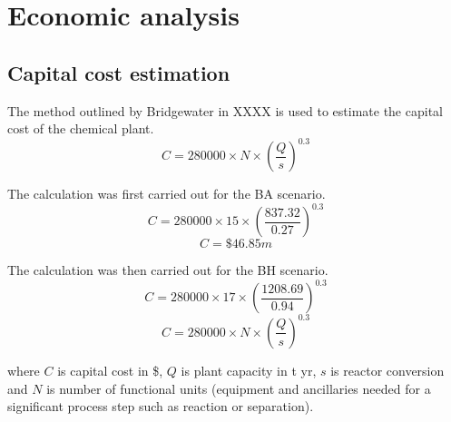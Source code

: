 
\section{Economic analysis}
\label{app:economics}
\subsection{Capital cost estimation}

The method outlined by Bridgewater in XXXX is used to estimate the capital cost of the chemical plant.
\begin{equation}
    C=280000 \times N \times (\frac{Q}{s})^0.3
\end{equation}

The calculation was first carried out for the BA scenario.
\begin{equation}
    C=280000 \times 15 \times (\frac{837.32}{0.27})^0.3
\end{equation}
\begin{equation}
    C=\$46.85m
\end{equation}
    
The calculation was then carried out for the BH scenario.
\begin{equation}
    C=280000 \times 17 \times (\frac{1208.69}{0.94} )^0.3
\end{equation}
\begin{equation}
    C=280000 \times N \times (\frac{Q}{s})^0.3
\end{equation}

where $C$ is capital cost in \$, $Q$ is  plant capacity in t yr, $s$ is reactor conversion and $N$ is number of functional units (equipment and ancillaries needed for a significant process step such as reaction or separation).